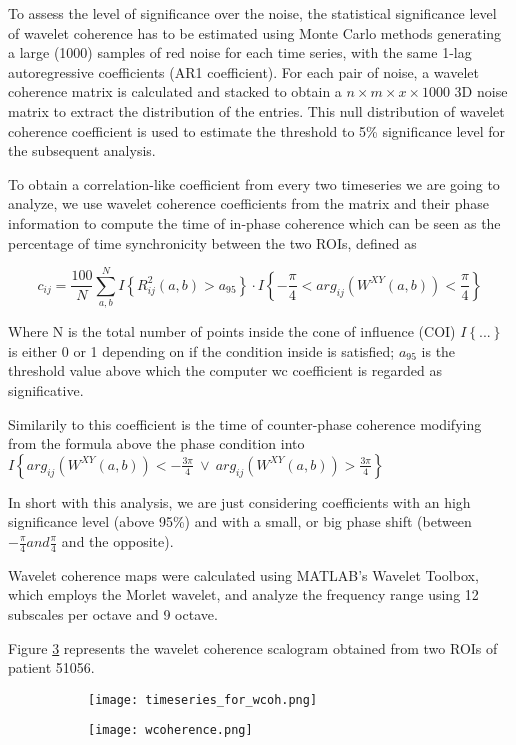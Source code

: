 \documentclass[a4paper,11pt]{article}
\begin{document}
To assess the level of significance over the noise, the statistical significance level of wavelet coherence has to be estimated using Monte Carlo methods generating a large (1000) samples of red noise for each time series, with the same 1-lag autoregressive coefficients (AR1 coefficient). For each pair of noise, a wavelet coherence matrix is calculated and stacked to obtain a $n\times m \times x \times 1000$ 3D noise matrix to extract the distribution of the entries. This null distribution of wavelet coherence coefficient is used to estimate the threshold to 5\% significance level for the subsequent analysis.

To obtain a correlation-like coefficient from every two timeseries we are going to analyze, we use wavelet coherence coefficients from the matrix and their phase information to compute the time of in-phase coherence which can be seen as the percentage of time synchronicity between the two ROIs, defined as

\begin{equation} \label{eq:wcohcoefficients}
c_{ij} = \frac{100}{N}\sum_{a, b}^N I\left\{ R_{ij}^2(a,b) > a_{95}\right\}\cdot I\left\{-\frac{\pi}{4}<arg_{ij}(W^{XY}(a, b)) < \frac{\pi}{4}  \right\}
\end{equation}

Where N is the total number of points inside the cone of influence (COI) $I\left\{ ...\right\}$ is either 0 or 1 depending on if the condition inside is satisfied; $a_{95}$ is the threshold value above which the computer wc coefficient is regarded as significative.

Similarily to this coefficient is the time of counter-phase coherence modifying from the formula above the phase condition into $I\left\{arg_{ij}(W^{XY}(a, b)) < -\frac{3\pi}{4} \ \lor \ arg_{ij}(W^{XY}(a, b)) >\frac{3\pi}{4}  \right\}$

In short with this analysis, we are just considering coefficients with an high significance level (above 95\%) and with a small, or big phase shift (between $-\frac{\pi}{4} and \frac{\pi}{4}$ and the opposite).

Wavelet coherence maps were calculated using MATLAB's Wavelet Toolbox, which employs the Morlet wavelet, and analyze the frequency range using 12 subscales per octave and 9 octave.

Figure \ref{fig:wcoherence} represents the wavelet coherence scalogram obtained from two ROIs of patient 51056.



\begin{figure}
\begin{subfigure}{0.5\textwidth}
\texttt{[image: timeseries\_for\_wcoh.png]}
\caption{}
\label{fig:wcoherence1}
\end{subfigure}
\begin{subfigure}{0.5\textwidth}
\texttt{[image: wcoherence.png]}
\caption{}
\label{fig:wcoherence2}
\end{subfigure}
\caption{}
\label{fig:wcoherence}
\end{figure}
\end{document}
